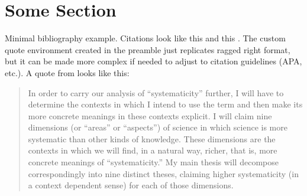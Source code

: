 \documentclass[10pt,a4paper]{article}
\begin{document}
	
\tableofcontents

\newpage

\section{Some Section}

Minimal bibliography example.
Citations look like this \parencite{hoyningen-huene2013} and this \parencite{manzo.vanderijt2020}.
The custom quote environment created in the preamble just replicates ragged right format, but it can be made more complex if needed to adjust to citation guidelines (APA, etc.).
A quote from \parencite[27]{hoyningen-huene2013} looks like this:
\begin{quote}
	In order to carry our analysis of “systematicity” further, I will have to determine the contexts in which I intend to use the term and then make its more concrete 	meanings in these contexts explicit. I will claim nine dimensions (or “areas” or 	“aspects”) of science in which science is more systematic than other kinds of 	knowledge. These dimensions are the contexts in which we will find, in a natural 	way, richer, that is, more concrete meanings of “systematicity.” My main thesis 	will decompose correspondingly into nine distinct theses, claiming higher 	systematicity (in a context dependent sense) for each of those dimensions.
\end{quote}


\nocite{*}  %
\printbibliography[heading=bibintoc]
	
\end{document}
